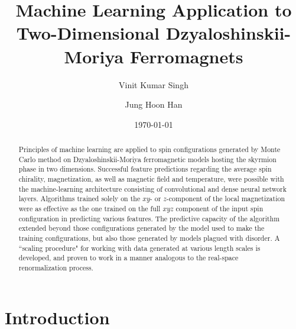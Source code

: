 \documentclass[reprint,amsmath,amssymb,aps,showpacs,superscriptaddress,prb]{revtex4-1}
\begin{document}
%
\title{Machine Learning Application to Two-Dimensional Dzyaloshinskii-Moriya Ferromagnets}

\author{Vinit Kumar Singh}
\author{Jung Hoon Han}
\date{\today}

\begin{abstract}
Principles of machine learning are applied to spin configurations generated by Monte Carlo method on Dzyaloshinskii-Moriya ferromagnetic models hosting the skyrmion phase in two dimensions. Successful feature predictions regarding the average spin chirality, magnetization, as well as magnetic field and temperature, were possible with the machine-learning architecture consisting of convolutional and dense neural network layers. Algorithms trained solely on the $xy$- or $z$-component of the local magnetization were as effective as the one trained on the full $xyz$ component of the input spin configuration in predicting various features. The predictive capacity of the algorithm extended beyond those configurations generated by the model used to make the training configurations, but also those generated by models plagued with disorder. A ``scaling procedure" for working with data generated at various length scales is developed, and proven to work in a manner analogous to the real-space renormalization process.
\end{abstract}
\maketitle

\section{Introduction}
\end{document}
